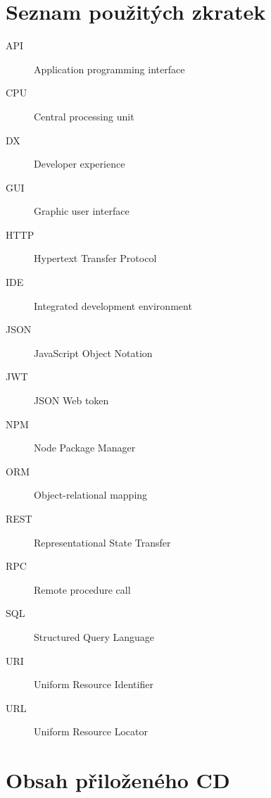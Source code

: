 \documentclass[thesis=M,czech]{FITthesis}[2019/12/23]
\begin{document}
\chapter{Seznam použitých zkratek}
\begin{description}
	\item[API] Application programming interface
	\item[CPU] Central processing unit
	\item[DX] Developer experience
	\item[GUI] Graphic user interface
	\item[HTTP] Hypertext Transfer Protocol
	\item[IDE] Integrated development environment
	\item[JSON] JavaScript Object Notation
	\item[JWT] JSON Web token
	\item[NPM] Node Package Manager
	\item[ORM] Object-relational mapping
	\item[REST] Representational State Transfer
	\item[RPC] Remote procedure call
	\item[SQL] Structured Query Language
	\item[URI] Uniform Resource Identifier
	\item[URL] Uniform Resource Locator  
\end{description} 

\chapter{Obsah přiloženého CD}

\begin{figure}
\end{figure}
\end{document}
